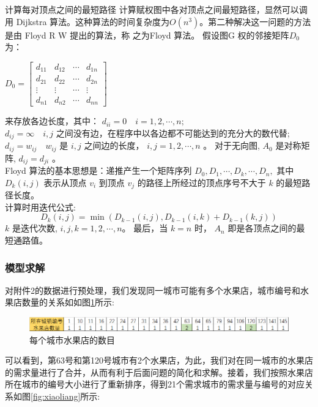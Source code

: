 \documentclass{article}
\begin{document}
    \FloatBarrier
	计算每对顶点之间的最短路径
	计算赋权图中各对顶点之间最短路径，显然可以调用 Dijkstra 算法。这种算法的时间复杂度为$O\left(n^{3}\right)$。第二种解决这一问题的方法是由 Floyd R W 提出的算法，称
	之为Floyd 算法。
	假设图G 权的邻接矩阵$D_0$为：\\
	\begin{center}
	$D_{0}=\left[\begin{array}{cccc}d_{11} & d_{12} & \cdots & d_{1 n} \\ d_{21} & d_{22} & \cdots & d_{2 n} \\ \vdots & \vdots & \cdots & \vdots \\ d_{n 1} & d_{n 2} & \cdots & d_{n n}\end{array}\right]$
	\end{center}
    来存放各边长度，其中：
	$d_{i i}=0 \quad i=1,2, \cdots, n ;$\\
	$d_{i j}=\infty \quad i, j$ 之间没有边，在程序中以各边都不可能达到的充分大的数代替; \\
	$d_{i j}=w_{i j} \quad w_{i j}$ 是 $i, j$ 之间边的长度， $i, j=1,2, \cdots, n$ 。 对于无向图, $A_{0}$ 是对称矩阵,
	 $d_{i j}=d_{j i} $ 。\\
	 Floyd 算法的基本思想是：递推产生一个矩阵序列 $D_{0}, D_{1}, \cdots, D_{k}, \cdots, D_{n},$ 其中$D_{k}(i, j)$ 表示从顶点 $v_{i}$ 到顶点 $v_{j}$ 的路径上所经过的顶点序号不大于 $k$ 的最短路径长度。\\
	 计算时用迭代公式:
	 $$
	 D_{k}(i, j)=\min \left(D_{k-1}(i, j), D_{k-1}(i, k)+D_{k-1}(k, j)\right)
	 $$
	 $k$ 是迭代次数, $i, j, k=1,2, \cdots, n $。
	 最后，当 $k=n$ 时， $A_{n}$ 即是各顶点之间的最短通路值。
	 
	 \subsubsection{模型求解}
	 
	 对附件2的数据进行预处理，我们发现同一城市可能有多个水果店，城市编号和水果店数量的关系如如图\ref{fig:dianshu}所示:
	 \begin{figure}[H]
	 	\centering
	 	\includegraphics[width=1.0\linewidth]{img/dianshu.png}
	 	\caption{每个城市水果店的数目}
	 	\label{fig:dianshu}
	 \end{figure}
	 
	 可以看到，第63号和第120号城市有2个水果店，为此，我们对在同一城市的水果店的需求量进行了合并，从而有利于后面问题的简化和求解。接着，我们按照水果店所在城市的编号大小进行了重新排序，得到21个需求城市的需求量与编号的对应关系如图\ref{fig:xiaoliang}所示:
	 
\end{document}
